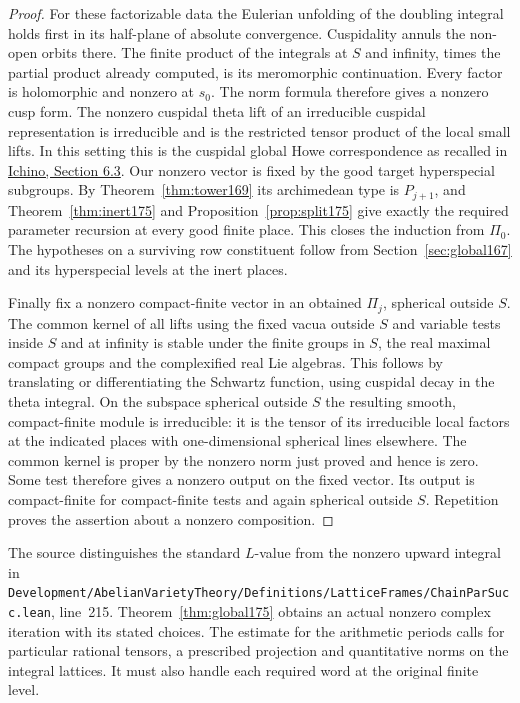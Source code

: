 \documentclass[a4paper,11pt]{article}
\theoremstyle{definition}
\theoremstyle{remark}
\newcommand{\srcloc}[2]{{\small\nolinkurl{#1.lean}}, line~#2}
\numberwithin{equation}{section}
\begin{document}
\begin{proof}
For these factorizable data the Eulerian unfolding of the
doubling integral holds first in its half-plane of absolute
convergence. Cuspidality annuls the non-open orbits there.
The finite product of the integrals at \(S\) and infinity,
times the partial product already computed, is its meromorphic
continuation. Every factor is holomorphic and nonzero at
\(s_0\). The norm formula therefore gives a nonzero cusp
form. The nonzero cuspidal theta lift of an irreducible
cuspidal representation is irreducible and is the restricted
tensor product of the local small lifts. In this setting this
is the cuspidal global Howe correspondence as recalled in
\href{https://arxiv.org/pdf/2002.09148}{Ichino, Section 6.3}.
Our nonzero vector is fixed by the good target hyperspecial
subgroups. By Theorem~\ref{thm:tower169} its archimedean
type is \(P_{j+1}\), and Theorem~\ref{thm:inert175} and
Proposition~\ref{prop:split175} give exactly the required
parameter recursion at every good finite place. This closes
the induction from \(\Pi_0\). The hypotheses on a surviving
row constituent follow from Section~\ref{sec:global167}
and its hyperspecial levels at the inert places.

Finally fix a nonzero compact-finite vector in an obtained
\(\Pi_j\), spherical outside \(S\). The common kernel of
all lifts using the fixed vacua outside \(S\) and variable
tests inside \(S\) and at infinity is stable under the
finite groups in \(S\), the real maximal compact groups
and the complexified real Lie algebras. This follows by
translating or differentiating the Schwartz function, using
cuspidal decay in the theta integral. On the subspace
spherical outside \(S\) the resulting smooth, compact-finite
module is irreducible: it is the tensor of its irreducible
local factors at the indicated places with one-dimensional
spherical lines elsewhere. The common kernel is proper by
the nonzero norm just proved and hence is zero. Some test
therefore gives a nonzero output on the fixed vector. Its
output is compact-finite for compact-finite tests and again
spherical outside \(S\). Repetition proves the assertion
about a nonzero composition.
\end{proof}

The source distinguishes the standard \(L\)-value from
the nonzero upward integral in
\srcloc{Development/AbelianVarietyTheory/Definitions/LatticeFrames/ChainParSucc}{215}.
Theorem~\ref{thm:global175} obtains an actual nonzero complex
iteration with its stated choices. The estimate for the
arithmetic periods calls for particular rational tensors,
a prescribed projection and quantitative norms on the
integral lattices. It must also handle each required word
at the original finite level.
\end{document}
